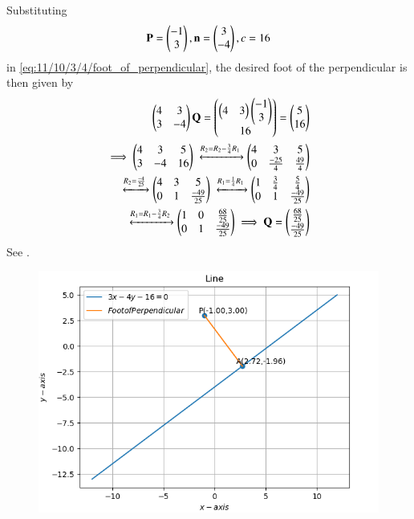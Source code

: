 Substituting
\begin{align}
 \mathbf{P}=\begin{pmatrix}
-1\\
3
\end{pmatrix},
\mathbf{n}=\begin{pmatrix}
3\\
-4
\end{pmatrix}, c=16
\end{align}
in 
	\eqref{eq:11/10/3/4/foot_of_perpendicular},
the desired foot of the perpendicular is then given by 
\begin{align}
\myvec{4&3\\3&-4}\vec{Q}=\myvec{\myvec{4&3}\myvec{-1\\3}\\16}
=\myvec{5\\16}  
\\
\implies
  \myvec{
   4 &  3  & 5\\
   3 & -4  & 16} 
  \xleftrightarrow[]{R_2=R_2-\frac{3}{4}R_1}
  \myvec{
  4 & 3 & 5\\
  0 & \frac{-25}{4} & \frac{49}{4}} 
\\
  \xleftrightarrow{R_2=\frac{-4}{25}}
  \myvec{
  4 & 3 & 5\\
  0 & 1 & \frac{-49}{25}}
  \xleftrightarrow{R_1=\frac{1}{4}R_1}
  \myvec{
  1 & \frac{3}{4} & \frac{5}{4}\\
  0 & 1 & \frac{-49}{25}}
\\
  \xleftrightarrow{R_1=R_1-\frac{3}{4}R_2}
  \myvec{
  1 & 0 & \frac{68}{25}\\
  0 & 1 & \frac{-49}{25}}          
\implies \vec{Q}=\myvec{
\frac{68}{25}\\[1pt]
\frac{-49}{25}
}
\end{align}
See 
.
\begin{figure}[!h]
	\begin{center} 
	    \includegraphics[width=\columnwidth]{chapters/11/10/3/14/figs/lines.png}
	\end{center}
\caption{}
\label{fig:chapters/11/10/3/14/Fig}
\end{figure}
